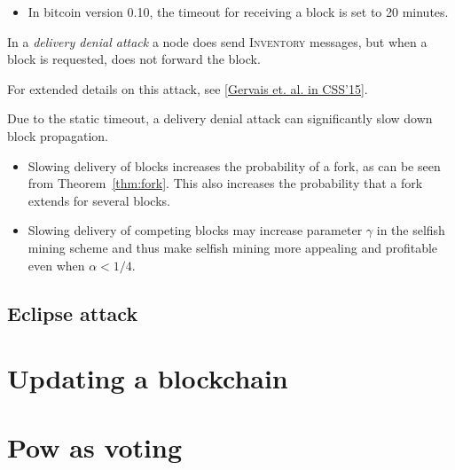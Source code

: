 \begin{itemize}
	\item In bitcoin version 0.10, the timeout for receiving a block is set to 20 minutes.
\end{itemize}

\begin{definition}
In a \emph{delivery denial attack} a node does send \textsc{Inventory} messages, but when a block is requested, does not forward the block.	
\end{definition}

For extended details on this attack, see \href{https://scalingbitcoin.org/zh_HANS/papers/bitcoin-block-transaction-delivery.pdf}{[Gervais et. al. in CSS'15]}.

\begin{note}
	Due to the static timeout, a delivery denial attack can significantly slow down block propagation.
	
	\begin{itemize}
		\item Slowing delivery of blocks increases the probability of a fork, as can be seen from Theorem~\ref{thm:fork}. This also increases the probability that a fork extends for several blocks.
		\item Slowing delivery of competing blocks may increase parameter $\gamma$ in the selfish mining scheme and thus make selfish mining more appealing and profitable even when $\alpha<1/4$.
	\end{itemize}
	
\end{note}

\subsection{Eclipse attack}




\section{Updating a blockchain}

\section{Pow as voting}